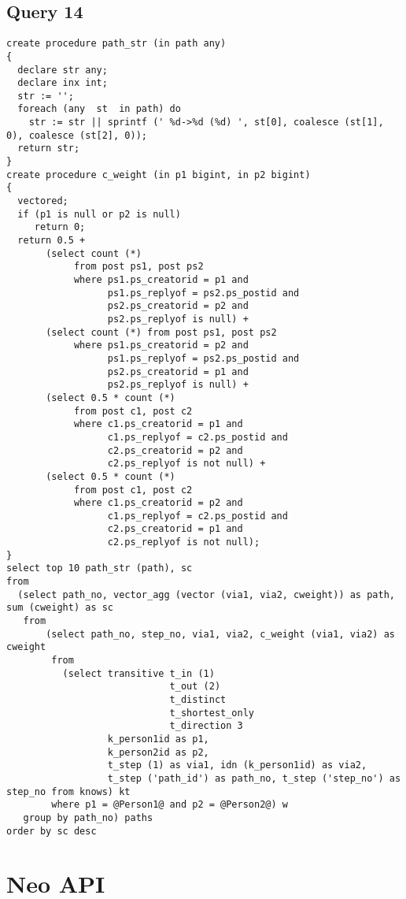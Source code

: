 \subsection{Query 14}
{\footnotesize
\begin{verbatim}
create procedure path_str (in path any)
{
  declare str any;
  declare inx int;
  str := '';
  foreach (any  st  in path) do
    str := str || sprintf (' %d->%d (%d) ', st[0], coalesce (st[1], 0), coalesce (st[2], 0));
  return str;
} 
create procedure c_weight (in p1 bigint, in p2 bigint)
{
  vectored;
  if (p1 is null or p2 is null)
     return 0;
  return 0.5 +
       (select count (*) 
            from post ps1, post ps2
            where ps1.ps_creatorid = p1 and 
                  ps1.ps_replyof = ps2.ps_postid and
                  ps2.ps_creatorid = p2 and 
                  ps2.ps_replyof is null) +
       (select count (*) from post ps1, post ps2
            where ps1.ps_creatorid = p2 and 
                  ps1.ps_replyof = ps2.ps_postid and
                  ps2.ps_creatorid = p1 and 
                  ps2.ps_replyof is null) +
       (select 0.5 * count (*) 
            from post c1, post c2
            where c1.ps_creatorid = p1 and
                  c1.ps_replyof = c2.ps_postid and
                  c2.ps_creatorid = p2 and 
                  c2.ps_replyof is not null) +
       (select 0.5 * count (*) 
            from post c1, post c2
            where c1.ps_creatorid = p2 and 
                  c1.ps_replyof = c2.ps_postid and 
                  c2.ps_creatorid = p1 and 
                  c2.ps_replyof is not null);
} 
select top 10 path_str (path), sc
from
  (select path_no, vector_agg (vector (via1, via2, cweight)) as path, sum (cweight) as sc
   from
       (select path_no, step_no, via1, via2, c_weight (via1, via2) as cweight
        from
          (select transitive t_in (1) 
                             t_out (2) 
                             t_distinct 
                             t_shortest_only 
                             t_direction 3
                  k_person1id as p1, 
                  k_person2id as p2, 
                  t_step (1) as via1, idn (k_person1id) as via2,
                  t_step ('path_id') as path_no, t_step ('step_no') as step_no from knows) kt
        where p1 = @Person1@ and p2 = @Person2@) w
   group by path_no) paths
order by sc desc
\end{verbatim}
}


\section{Neo API}

